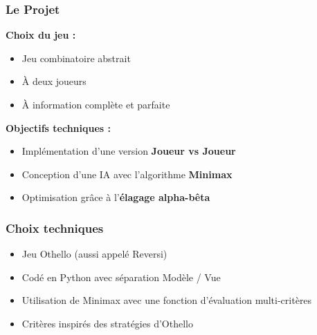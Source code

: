 \begin{frame}
\frametitle{Le Projet}

\textbf{Choix du jeu :}
\begin{itemize}
    \item Jeu combinatoire abstrait
    \item À deux joueurs
    \item À information complète et parfaite
\end{itemize}

\bigskip

\textbf{Objectifs techniques :}
\begin{itemize}
    \item Implémentation d’une version \textbf{Joueur vs Joueur}
    \item Conception d’une IA avec l’algorithme \textbf{Minimax}
    \item Optimisation grâce à l’\textbf{élagage alpha-bêta}
\end{itemize}
\end{frame}


\begin{frame}
\frametitle{Choix techniques}
\begin{itemize}
    \item Jeu Othello (aussi appelé Reversi)
    \item Codé en Python avec séparation Modèle / Vue
    \item Utilisation de Minimax avec une fonction d’évaluation multi-critères
    \item Critères inspirés des stratégies d’Othello
\end{itemize}
\end{frame}

